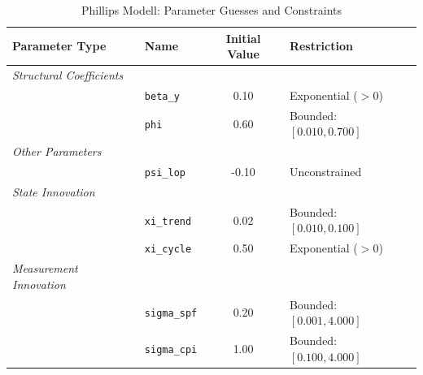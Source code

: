\begin{table}[htbp]
\centering
\caption{Phillips Modell: Parameter Guesses and Constraints}
\label{tab:phillips_model_ssm_specs}
\begin{tabular}{llcl}
\hline\hline
\textbf{Parameter Type} & \textbf{Name} & \textbf{Initial Value} & \textbf{Restriction} \\ \hline
\textit{Structural Coefficients} &&& \\
    & \texttt{beta\_y} & 0.10 & Exponential ($>0$) \\
    & \texttt{phi} & 0.60 & Bounded: $[0.010, 0.700]$ \\
\hline
\textit{Other Parameters} &&& \\
    & \texttt{psi\_lop} & -0.10 & Unconstrained \\
\hline
\textit{State Innovation} &&& \\
    & \texttt{xi\_trend} & 0.02 & Bounded: $[0.010, 0.100]$ \\
    & \texttt{xi\_cycle} & 0.50 & Exponential ($>0$) \\
\hline
\textit{Measurement Innovation} &&& \\
    & \texttt{sigma\_spf} & 0.20 & Bounded: $[0.001, 4.000]$ \\
    & \texttt{sigma\_cpi} & 1.00 & Bounded: $[0.100, 4.000]$ \\
\hline\hline
\end{tabular}
\end{table}
